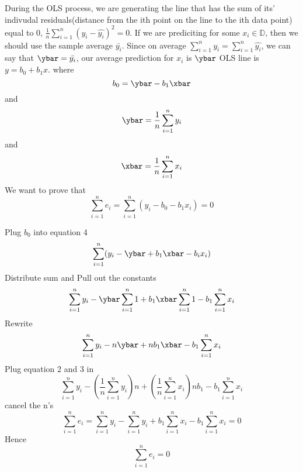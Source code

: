 \documentclass[12pt]{article}
\begin{document}
\begin{enumerate}
During the OLS process, we are generating the line that has the sum of its' indivudal residuals(distance from the ith point on the line to the ith data point) equal to 0, $\frac{1}{n}\sum\limits_{i=1}^n(y_i-\hat{y_i})^2 = 0$. If we are prediciting for some $x_i\in\mathbb{D}$, then we should use the sample average $\bar{y_i}$. Since on average $\sum\limits_{i=1}^ny_i=\sum\limits_{i=1}^n\hat{y_i}$, we can say that $\ybar=\bar{y_i}$, our average prediction for $x_i$ is $\ybar$
\setcounter{equation}{0}
OLS line is $y=b_0+b_1x$. where \begin{equation}
b_0=\ybar-b_1\xbar 
\end{equation}                                       
and \begin{equation}
\ybar=\frac{1}{n}\sum\limits_{i=1}^ny_i 
\end{equation}
and \begin{equation}
\xbar=\frac{1}{n}\sum\limits_{i=1}^nx_i
\end{equation}
We want to prove that \begin{equation}
\sum\limits_{i=1}^ne_i=\sum\limits_{i=1}^n(y_i-b_0-b_1x_i)=0
\end{equation}

Plug $b_0$ into equation 4 \begin{equation*}
\sum\limits_{i=1}^n(y_i-\ybar+b_1\xbar-b_ix_i)
\end{equation*}
Distribute sum and Pull out the constants
\begin{equation*}
\sum\limits_{i=1}^ny_i-\ybar\sum\limits_{i=1}^n1+b_1\xbar\sum\limits_{i=1}^n1-b_1\sum\limits_{i=1}^nx_i
\end{equation*}
Rewrite \begin{equation*}
\sum\limits_{i=1}^ny_i-n\ybar+nb_1\xbar-b_1\sum\limits_{i=1}^nx_i
\end{equation*}
Plug equation 2 and 3 in
\begin{equation*}
\sum\limits_{i=1}^ny_i-(\frac{1}{n}\sum\limits_{i=1}^ny_i)n+(\frac{1}{n}\sum\limits_{i=1}^nx_i)nb_1-b_1\sum\limits_{i=1}^nx_i
\end{equation*}
cancel the n's
\begin{equation*}
\sum\limits_{i=1}^ne_i=\sum\limits_{i=1}^ny_i-\sum\limits_{i=1}^ny_i+b_1\sum\limits_{i=1}^nx_i-b_1\sum\limits_{i=1}^nx_i = 0
\end{equation*}
Hence \begin{equation}
\sum\limits_{i=1}^ne_i=0
\end{equation}


\end{enumerate}
\end{document}
